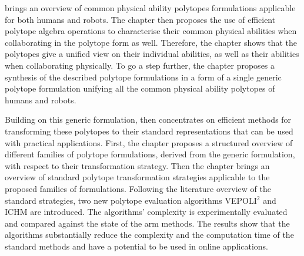  brings an overview of common physical ability polytopes formulations applicable for both humans and robots. The chapter then proposes the use of efficient polytope algebra operations to characterise their common physical abilities when collaborating in the polytope form as well. Therefore, the chapter shows that the polytopes give a unified view on their individual abilities, as well as their abilities when collaborating physically. To go a step further, the chapter proposes a synthesis of the described polytope formulations in a form of a single generic polytope formulation unifying all the common physical ability polytopes of humans and robots.



Building on this generic formulation,  then concentrates on efficient methods for transforming these polytopes to their standard representations that can be used with practical applications. First, the chapter proposes a structured overview of different families of polytope formulations, derived from the generic formulation, with respect to their transformation strategy. Then the chapter brings an overview of standard polytope transformation strategies applicable to the proposed families of formulations. 
Following the literature overview of the standard strategies, two new polytope evaluation algorithms VEPOLI$^2$ and ICHM are introduced. The algorithms' complexity is experimentally evaluated and compared against the state of the arm methods. The results show that the algorithms substantially reduce the complexity and the computation time of the standard methods and have a potential to be used in online applications.

